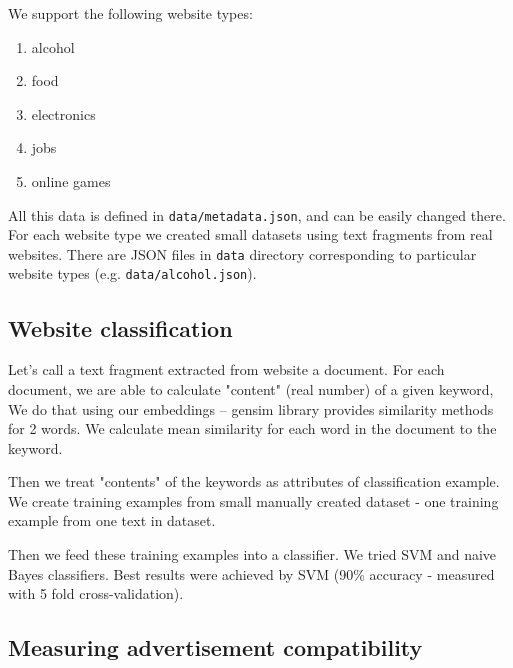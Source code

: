 \documentclass[a4paper]{article}
\begin{document}
We support the following website types:
\begin{enumerate}
    \item alcohol
    \item food
    \item electronics
    \item jobs
    \item online games
\end{enumerate}

All this data is defined in \texttt{data/metadata.json}, and can be easily changed there.
For each website type we created small datasets using text fragments from real websites.
There are JSON files in \texttt{data} directory corresponding to particular website types
(e.g. \texttt{data/alcohol.json}).


\subsection{Website classification}

Let's call a text fragment extracted from website a document.
For each document, we are able to calculate "content" (real number) of a given keyword,
We do that using our embeddings -- gensim library provides similarity methods for 2 words.
We calculate mean similarity for each word in the document to the keyword.

Then we treat "contents" of the keywords as attributes of classification example.
We create training examples from small manually created dataset - one training example from one text in dataset.

Then we feed these training examples into a classifier.
We tried SVM and naive Bayes classifiers.
Best results were achieved by SVM (90\% accuracy - measured with 5 fold cross-validation).


\subsection{Measuring advertisement compatibility}
\label{mainlogic}
\end{document}

